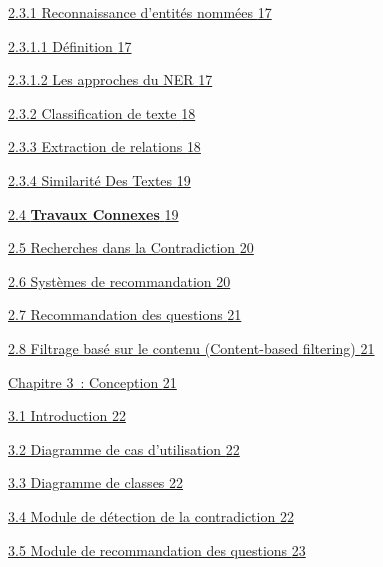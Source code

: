 \documentclass[
]{article}
\begin{document}
\hyperref[reconnaissance-dentituxe9s-nommuxe9es]{2.3.1 Reconnaissance
d'entités nommées \hyperref[reconnaissance-dentituxe9s-nommuxe9es]{17}}

\hyperref[duxe9finition]{2.3.1.1 Définition
\hyperref[duxe9finition]{17}}

\hyperref[les-approches-du-ner]{2.3.1.2 Les approches du NER
\hyperref[les-approches-du-ner]{17}}

\hyperref[classification-de-texte]{2.3.2 Classification de texte
\hyperref[classification-de-texte]{18}}

\hyperref[extraction-de-relations]{2.3.3 Extraction de relations
\hyperref[extraction-de-relations]{18}}

\hyperref[approche-de-supervision-distante]{2.3.4 Similarité Des Textes
\hyperref[approche-de-supervision-distante]{19}}

\hyperref[travaux-connexes]{2.4 \textbf{Travaux Connexes}
\hyperref[travaux-connexes]{19}}

\hyperref[recherches-dans-la-contradiction]{2.5 Recherches dans la
Contradiction \hyperref[recherches-dans-la-contradiction]{20}}

\hyperref[systuxe8mes-de-recommandation]{2.6 Systèmes de recommandation
\hyperref[systuxe8mes-de-recommandation]{20}}

\hyperref[recommandation-des-questions]{2.7 Recommandation des questions
\hyperref[recommandation-des-questions]{21}}

\hyperref[filtrage-basuxe9-sur-le-contenu-content-based-filtering]{2.8
Filtrage basé sur le contenu (Content-based filtering)
\hyperref[filtrage-basuxe9-sur-le-contenu-content-based-filtering]{21}}

\hyperref[chapitre-3-conception]{Chapitre 3~: Conception
\hyperref[chapitre-3-conception]{21}}

\hyperref[introduction-8]{3.1 Introduction
\hyperref[introduction-8]{22}}

\hyperref[diagramme-de-cas-dutilisation]{3.2 Diagramme de cas
d'utilisation \hyperref[diagramme-de-cas-dutilisation]{22}}

\hyperref[diagramme-de-classes]{3.3 Diagramme de classes
\hyperref[diagramme-de-classes]{22}}

\hyperref[module-de-duxe9tection-de-la-contradiction]{3.4 Module de
détection de la contradiction
\hyperref[module-de-duxe9tection-de-la-contradiction]{22}}

\hyperref[module-de-recommandation-des-questions]{3.5 Module de
recommandation des questions
\hyperref[module-de-recommandation-des-questions]{23}}
\end{document}
